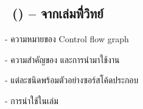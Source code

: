 \subsection{{\cfg}\ ({\cfgen}) -- จากเล่มพี่ิวิทย์}

- ความหมายของ Control flow graph 

- ความสำคัญของ \cfg และการนำมาใช้งาน

- {\cfg}แต่ละชนิดพร้อมตัวอย่างซอร์สโค้ดประกอบ

- การนำใช้ในเล่ม
